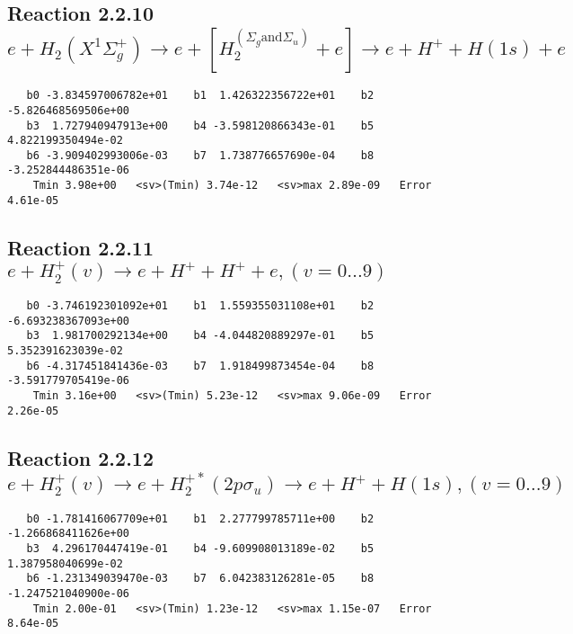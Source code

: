 \documentclass[12pt]{article}
\begin{document}
\newpage
\subsection{
Reaction 2.2.10 $e + H_2(X^1\Sigma_g^+) \rightarrow 
e + [H_2^(\Sigma_g \mbox{and} \Sigma_u) + e] \rightarrow e + H^+ + H(1s) + e$}














\begin{small}\begin{verbatim}
   b0 -3.834597006782e+01    b1  1.426322356722e+01    b2 -5.826468569506e+00
   b3  1.727940947913e+00    b4 -3.598120866343e-01    b5  4.822199350494e-02
   b6 -3.909402993006e-03    b7  1.738776657690e-04    b8 -3.252844486351e-06
    Tmin 3.98e+00   <sv>(Tmin) 3.74e-12   <sv>max 2.89e-09   Error 4.61e-05
\end{verbatim}\end{small}

\newpage
\subsection{
Reaction 2.2.11 $  e + H_2^+(v) \rightarrow e + H^+ + H^+ + e, (v=0\ldots 9)$}


\begin{small}\begin{verbatim}
   b0 -3.746192301092e+01    b1  1.559355031108e+01    b2 -6.693238367093e+00
   b3  1.981700292134e+00    b4 -4.044820889297e-01    b5  5.352391623039e-02
   b6 -4.317451841436e-03    b7  1.918499873454e-04    b8 -3.591779705419e-06
    Tmin 3.16e+00   <sv>(Tmin) 5.23e-12   <sv>max 9.06e-09   Error 2.26e-05
\end{verbatim}\end{small}

\newpage
\subsection{
Reaction 2.2.12 $  e + H_2^+(v) \rightarrow e + H_2^{+*} (2p\sigma_u) \rightarrow e + H^+ + H(1s), (v=0\ldots 9)$}


\begin{small}\begin{verbatim}
   b0 -1.781416067709e+01    b1  2.277799785711e+00    b2 -1.266868411626e+00
   b3  4.296170447419e-01    b4 -9.609908013189e-02    b5  1.387958040699e-02
   b6 -1.231349039470e-03    b7  6.042383126281e-05    b8 -1.247521040900e-06
    Tmin 2.00e-01   <sv>(Tmin) 1.23e-12   <sv>max 1.15e-07   Error 8.64e-05
\end{verbatim}\end{small}
\end{document}

